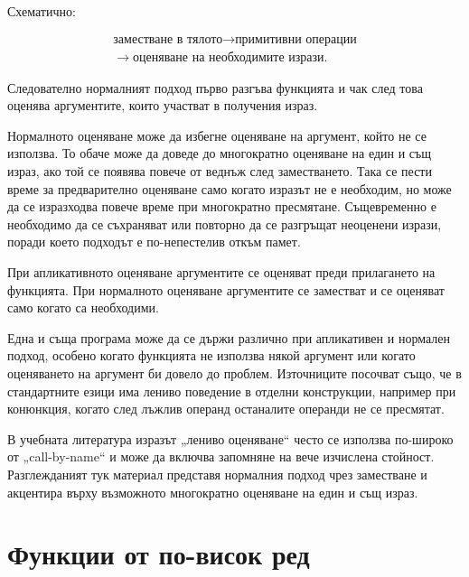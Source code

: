 Схематично:

\[
\begin{gathered}
\text{заместване в тялото}\longrightarrow\text{примитивни операции}\\
\longrightarrow\text{оценяване на необходимите изрази}.
\end{gathered}
\]

Следователно нормалният подход първо разгъва функцията и чак след това оценява аргументите, които участват в получения израз.

Нормалното оценяване може да избегне оценяване на аргумент, който не се използва. То обаче може да доведе до многократно оценяване на един и същ израз, ако той се появява повече от веднъж след заместването. Така се пести време за предварително оценяване само когато изразът не е необходим, но може да се изразходва повече време при многократно пресмятане. Същевременно е необходимо да се съхраняват или повторно да се разгръщат неоценени изрази, поради което подходът е по-непестелив откъм памет.

\begin{keydefn}
При апликативното оценяване аргументите се оценяват преди прилагането на функцията. При нормалното оценяване аргументите се заместват и се оценяват само когато са необходими.
\end{keydefn}

\begin{remark}
Една и съща програма може да се държи различно при апликативен и нормален подход, особено когато функцията не използва някой аргумент или когато оценяването на аргумент би довело до проблем. Източниците посочват също, че в стандартните езици има лениво поведение в отделни конструкции, например при конюнкция, когато след лъжлив операнд останалите операнди не се пресмятат.
\end{remark}

\begin{supp}
В учебната литература изразът „лениво оценяване“ често се използва по-широко от „call-by-name“ и може да включва запомняне на вече изчислена стойност. Разглежданият тук материал представя нормалния подход чрез заместване и акцентира върху възможното многократно оценяване на един и същ израз.
\end{supp}

\section{Функции от по-висок ред}\label{s:19.4}

